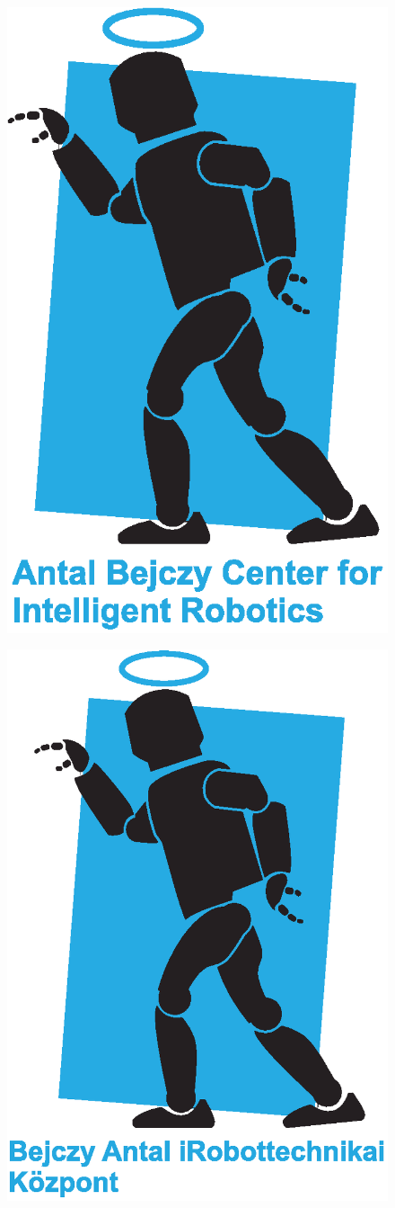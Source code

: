 \documentclass[a4paper,10pt]{article}
\begin{document}
				\begin{figure}
					\centering
					\includegraphics[width=0.7\linewidth]{logos-4}
				\end{figure}
				
					\begin{figure}
						\centering
						\includegraphics[width=0.7\linewidth]{logos-5}
					\end{figure}
	
\end{document}
